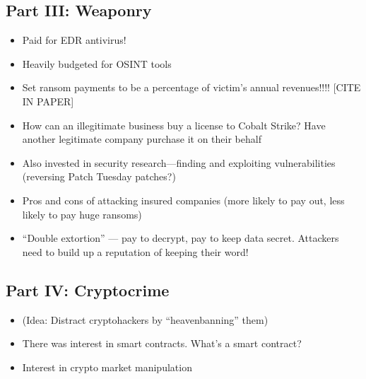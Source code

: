\documentclass[11pt]{article}
\begin{document}
\subsection{Part III: Weaponry}


\begin{itemize}
    \item Paid for EDR antivirus!
    \item Heavily budgeted for OSINT tools
    \item Set ransom payments to be a percentage of victim's annual revenues!!!! [CITE IN PAPER]
    \item How can an illegitimate business buy a license to Cobalt Strike? Have another legitimate company purchase it on their behalf
    \item Also invested in security research---finding and exploiting vulnerabilities (reversing Patch Tuesday patches?)
    \item Pros and cons of attacking insured companies (more likely to pay out, less likely to pay huge ransoms)
    \item ``Double extortion'' --- pay to decrypt, pay to keep data secret. Attackers need to build up a reputation of keeping their word!
\end{itemize}

\subsection{Part IV: Cryptocrime}

\begin{itemize}
    \item (Idea: Distract cryptohackers by ``heavenbanning'' them)
    \item There was interest in smart contracts. What's a smart contract?
    \item Interest in crypto market manipulation
\end{itemize}
\end{document}
